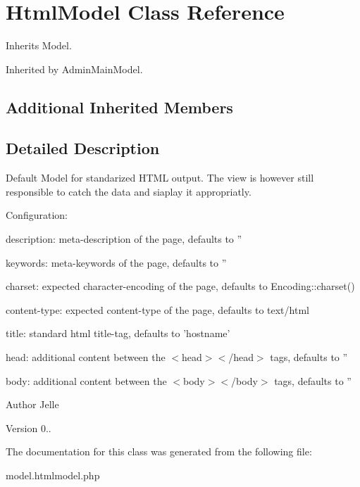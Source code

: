 \hypertarget{class_html_model}{\section{Html\-Model Class Reference}
\label{class_html_model}
}


Inherits Model.



Inherited by Admin\-Main\-Model.

\subsection*{Additional Inherited Members}


\subsection{Detailed Description}
Default Model for standarized H\-T\-M\-L output. The view is however still responsible to catch the data and siaplay it appropriatly.

Configuration\-:
\begin{DoxyItemize}
\item description\-: meta-\/description of the page, defaults to ''
\item keywords\-: meta-\/keywords of the page, defaults to ''
\item charset\-: expected character-\/encoding of the page, defaults to Encoding\-::charset()
\item content-\/type\-: expected content-\/type of the page, defaults to text/html
\item title\-: standard html title-\/tag, defaults to 'hostname'
\item head\-: additional content between the $<$head$>$$<$/head$>$ tags, defaults to ''
\item body\-: additional content between the $<$body$>$$<$/body$>$ tags, defaults to ''
\end{DoxyItemize}

\begin{DoxyAuthor}{Author}
Jelle 
\end{DoxyAuthor}
\begin{DoxyVersion}{Version}
0.. 
\end{DoxyVersion}


The documentation for this class was generated from the following file\-:\begin{DoxyCompactItemize}
\item 
model.\-htmlmodel.\-php\end{DoxyCompactItemize}
